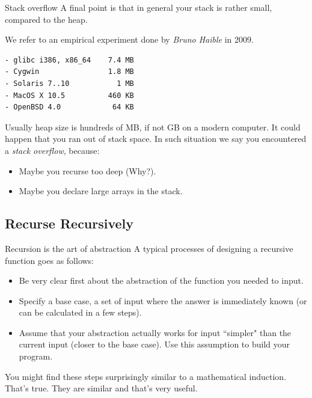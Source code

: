 \begin{frame}[fragile]{Stack overflow}
A final point is that in general your stack is rather small, compared to the heap.

We refer to an empirical experiment done by \textit{Bruno Haible} in 2009.

\begin{verbatim}
- glibc i386, x86_64    7.4 MB
- Cygwin                1.8 MB
- Solaris 7..10           1 MB
- MacOS X 10.5          460 KB
- OpenBSD 4.0            64 KB
\end{verbatim}

Usually heap size is hundreds of MB, if not GB on a modern computer. It could happen that you ran out of stack space. In such situation we say you encountered a \textit{stack overflow}, because: 
\begin{itemize}
	\item Maybe you recurse too deep (Why?). 
	\item Maybe you declare large arrays in the stack.
\end{itemize}
\end{frame}

\subsection{Recurse Recursively}
\begin{frame}{Recursion is the art of abstraction}
A typical processes of designing a recursive function goes as follows:
\begin{itemize}
	\item Be very clear first about the abstraction of the function you needed to input.
	\item Specify a base case, a set of input where the answer is immediately known (or can be calculated in a few steps).
	\item Assume that your abstraction actually works for input ``simpler" than the current input (closer to the base case). Use this assumption to build your program.
\end{itemize}
You might find these steps surprisingly similar to a mathematical induction. That's true. They are similar and that's very useful.
\end{frame}

